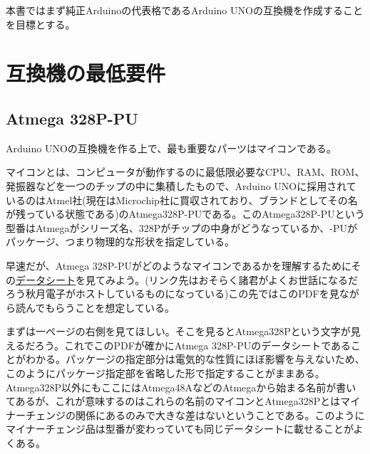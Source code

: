 \documentclass[a4paper,titlepage,here]{ujarticle}
\begin{document}
本書ではまず純正Arduinoの代表格であるArduino UNOの互換機を作成することを目標とする。
\section{互換機の最低要件}\label{minreq}
\subsection{Atmega 328P-PU}
Arduino UNOの互換機を作る上で、最も重要なパーツはマイコンである。

マイコンとは、コンピュータが動作するのに最低限必要なCPU、RAM、ROM、発振器などを一つのチップの中に集積したもので、Arduino UNOに採用されているのはAtmel社(現在はMicrochip社に買収されており、ブランドとしてその名が残っている状態である)のAtmega328P-PUである。このAtmega328P-PUという型番はAtmegaがシリーズ名、328Pがチップの中身がどうなっているか、-PUがパッケージ、つまり物理的な形状を指定している。

早速だが、Atmega 328P-PUがどのようなマイコンであるかを理解するためにその\href{http://akizukidenshi.com/download/mcu/avr/atmega48-88-168-328_A_P_PA.pdf}{データシート}を見てみよう。(リンク先はおそらく諸君がよくお世話になるだろう秋月電子がホストしているものになっている)この先ではこのPDFを見ながら読んでもらうことを想定している。

まずは一ページの右側を見てほしい。そこを見るとAtmega328Pという文字が見えるだろう。これでこのPDFが確かにAtmega 328P-PUのデータシートであることがわかる。パッケージの指定部分は電気的な性質にほぼ影響を与えないため、このようにパッケージ指定部を省略した形で指定することがままある。Atmega328P以外にもここにはAtmega48AなどのAtmegaから始まる名前が書いてあるが、これが意味するのはこれらの名前のマイコンとAtmega328Pとはマイナーチェンジの関係にあるのみで大きな差はないということである。このようにマイナーチェンジ品は型番が変わっていても同じデータシートに載せることがよくある。
\end{document}
